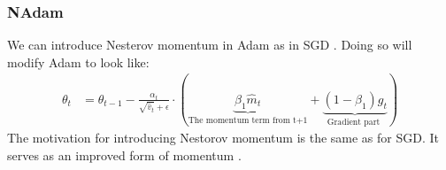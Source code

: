 \subsubsection{NAdam}
We can introduce Nesterov momentum in \ac{Adam} as in \ac{SGD} \cite{dozatINCORPORATINGNESTEROVMOMENTUM2016}.
Doing so will modify Adam to look like:
\begin{align}
	\theta_t  &= \theta_{t-1} -  \frac{\alpha_t}{\sqrt{\hat{v}_t} + \epsilon} \cdot (
	\underbrace{
		\beta_1 \hat{m}_t 
	}_\text{The momentum term from t+1} + \underbrace{(1-\beta_1) g_t
	}_\text{Gradient part } 
	)
\end{align}
The motivation for introducing Nestorov momentum is the same as for \ac{SGD}. It serves as an improved form of momentum \cite[see][sec 2]{dozatINCORPORATINGNESTEROVMOMENTUM2016}.

